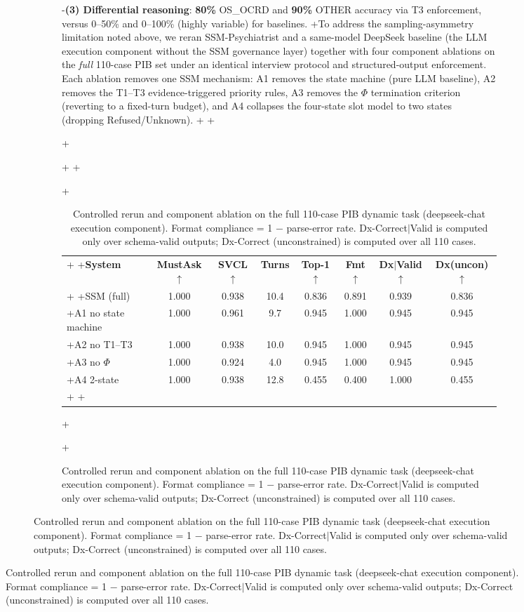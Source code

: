 \begin{figure}[t]
{\begin{figure}[!t]
{\begin{figure}[!t]
{-\textbf{(3) Differential reasoning}: \textbf{80\%} OS\_OCRD and \textbf{90\%} OTHER accuracy via T3 enforcement, versus 0--50\% and 0--100\% (highly variable) for baselines.
+To address the sampling-asymmetry limitation noted above, we reran SSM-Psychiatrist and a same-model DeepSeek baseline (the LLM execution component without the SSM governance layer) together with four component ablations on the \textit{full} 110-case PIB set under an identical interview protocol and structured-output enforcement. Each ablation removes one SSM mechanism: A1 removes the state machine (pure LLM baseline), A2 removes the T1--T3 evidence-triggered priority rules, A3 removes the $\Phi$ termination criterion (reverting to a fixed-turn budget), and A4 collapses the four-state slot model to two states (dropping Refused/Unknown).
+
+\begin{table}[htbp]
+\caption{Controlled rerun and component ablation on the full 110-case PIB dynamic task (deepseek-chat execution component). Format compliance = 1 $-$ parse-error rate. Dx-Correct$|$Valid is computed only over schema-valid outputs; Dx-Correct (unconstrained) is computed over all 110 cases.}
+\label{tab:ablation}
+\begin{center}
+\begin{tabular}{lccccccc}
+\toprule
+\textbf{System} & \textbf{MustAsk$\uparrow$} & \textbf{SVCL$\uparrow$} & \textbf{Turns} & \textbf{Top-1$\uparrow$} & \textbf{Fmt$\uparrow$} & \textbf{Dx$|$Valid$\uparrow$} & \textbf{Dx(uncon)$\uparrow$} \\
+\midrule
+SSM (full)            & 1.000 & 0.938 & 10.4 & 0.836 & 0.891 & 0.939 & 0.836 \\
+A1 no state machine   & 1.000 & 0.961 & 9.7  & 0.945 & 1.000 & 0.945 & 0.945 \\
+A2 no T1--T3          & 1.000 & 0.938 & 10.0 & 0.945 & 1.000 & 0.945 & 0.945 \\
+A3 no $\Phi$          & 1.000 & 0.924 & 4.0  & 0.945 & 1.000 & 0.945 & 0.945 \\
+A4 2-state            & 1.000 & 0.938 & 12.8 & 0.455 & 0.400 & 1.000 & 0.455 \\
+\bottomrule
+\end{tabular}
+\end{center}
+\end{table}
 
}
\end{figure}}
\end{figure}}
\end{figure}
